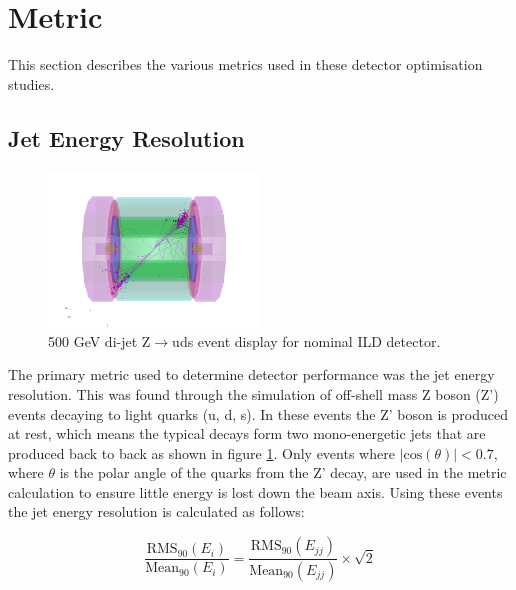 
\section{Metric}
This section describes the various metrics used in these detector optimisation studies.


\subsection{Jet Energy Resolution}
\begin{figure}
\centering
\includegraphics[width=0.5\textwidth]{OptimisationStudies/Plots/MethodDescription/500GeVEvent.png}
\caption[500 GeV di-jet Z$\rightarrow$uds event display for nominal ILD detector.]{500 GeV di-jet Z$\rightarrow$uds event display for nominal ILD detector.}
\label{fig:500GeVzudsevtdisplay}
\end{figure} 

The primary metric used to determine detector performance was the jet energy resolution.  This was found through the simulation of off-shell mass Z boson (Z') events decaying to light quarks (u, d, s).  In these events the Z' boson is produced at rest, which means the typical decays form two mono-energetic jets that are produced back to back as shown in figure \ref{fig:500GeVzudsevtdisplay}.  Only events where $|\text{cos}(\theta)| < 0.7$, where $\theta$ is the polar angle of the quarks from the Z' decay, are used in the metric calculation to ensure little energy is lost down the beam axis.  Using these events the jet energy resolution is calculated as follows: 

\begin{equation} 
\frac{\text{RMS}_{90}(E_{i})}{\text{Mean}_{90}(E_{i})} = \frac{\text{RMS}_{90}(E_{jj})}{\text{Mean}_{90}(E_{jj})} \times \sqrt{2}
\end{equation}

